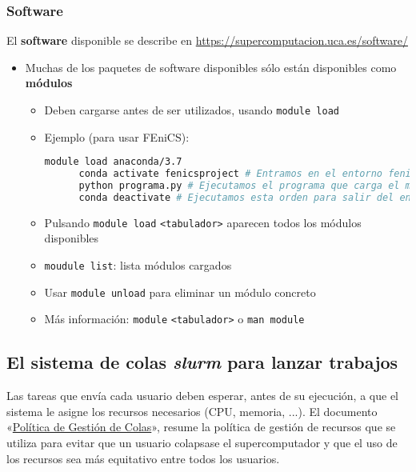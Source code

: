 \subsubsection*{Software}
El \textbf{software} disponible se describe en \url{https://supercomputacion.uca.es/software/}
\begin{itemize}
\item Muchas de los paquetes de software disponibles sólo están
  disponibles como \textbf{módulos}
  \begin{itemize}
  \item Deben cargarse antes de ser utilizados, usando
    \texttt{module load}
  \item Ejemplo (para usar FEniCS):
    \begin{lstlisting}[language=sh]
      module load anaconda/3.7
      conda activate fenicsproject # Entramos en el entorno fenicsproject en el que esta instalado FEniCS con Anaconda
      python programa.py # Ejecutamos el programa que carga el modulo de FEniCS mediante ``import fenics''
      conda deactivate # Ejecutamos esta orden para salir del entorno fenicsproject
    \end{lstlisting}
  \item Pulsando \texttt{module load} \texttt{<tabulador>} aparecen
    todos los módulos disponibles
  \item \texttt{moudule list}: lista módulos cargados
  \item Usar \texttt{module unload} para eliminar un módulo concreto

  \item Más información: \texttt{module} \texttt{<tabulador>} o \texttt{man module}
  \end{itemize}
\end{itemize}

\subsection{El sistema de colas \textit{slurm} para lanzar trabajos}
\label{sec:slurm}
Las tareas que envía cada usuario deben esperar, antes de su
ejecución, a que el sistema le asigne los recursos necesarios (CPU,
memoria, ...). El documento
«\href{http://supercomputacion.uca.es/recursos/documentacion/politicas-de-gestion-de-colas}{Política
  de Gestión de Colas}», resume la política de gestión de recursos que
se utiliza para evitar que un usuario colapsase el supercomputador y
que el uso de los recursos sea más equitativo entre todos los
usuarios.

